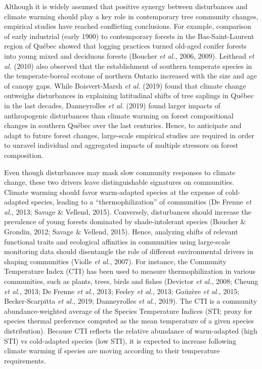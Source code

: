 \documentclass[a4paperpaper,]{article}
\begin{document}
Although it is widely assumed that positive synergy between disturbances
and climate warming should play a key role in contemporary tree
community changes, empirical studies have reached conflicting
conclusions. For example, comparison of early industrial (early 1900) to
contemporary forests in the Bas-Saint-Laurent region of Québec showed
that logging practices turned old-aged conifer forests into young mixed
and deciduous forests (Boucher \emph{et al.}, 2006, 2009). Leithead
\emph{et al.} (2010) also observed that the establishment of southern
temperate species in the temperate-boreal ecotone of northern Ontario
increased with the size and age of canopy gaps. While Boisvert‐Marsh
\emph{et al.} (2019) found that climate change outweighs disturbances in
explaining latitudinal shifts of tree saplings in Québec in the last
decades, Danneyrolles \emph{et al.} (2019) found larger impacts of
anthropogenic disturbances than climate warming on forest compositional
changes in southern Québec over the last centuries. Hence, to anticipate
and adapt to future forest changes, large-scale empirical studies are
required in order to unravel individual and aggregated impacts of
multiple stressors on forest composition.

Even though disturbances may mask slow community responses to climate
change, these two drivers leave distinguishable signatures on
communities. Climate warming should favor warm-adapted species at the
expense of cold-adapted species, leading to a ``thermophilization'' of
communities (De Frenne \emph{et al.}, 2013; Savage \& Vellend, 2015).
Conversely, disturbances should increase the prevalence of young forests
dominated by shade-intolerant species (Boucher \& Grondin, 2012; Savage
\& Vellend, 2015). Hence, analyzing shifts of relevant functional traits
and ecological affinities in communities using large-scale monitoring
data should disentangle the role of different environmental drivers in
shaping communities (Violle \emph{et al.}, 2007). For instance, the
Community Temperature Index (CTI) has been used to measure
thermophilization in various communities, such as plants, trees, birds
and fishes (Devictor \emph{et al.}, 2008; Cheung \emph{et al.}, 2013; De
Frenne \emph{et al.}, 2013; Feeley \emph{et al.}, 2013; Gaüzère \emph{et
al.}, 2015; Becker‐Scarpitta \emph{et al.}, 2019; Danneyrolles \emph{et
al.}, 2019). The CTI is a community abundance-weighted average of the
Species Temperature Indices (STI; proxy for species thermal preference
computed as the mean temperature of a given species distribution).
Because CTI reflects the relative abundance of warm-adapted (high STI)
vs cold-adapted species (low STI), it is expected to increase following
climate warming if species are moving according to their temperature
requirements.
\end{document}
